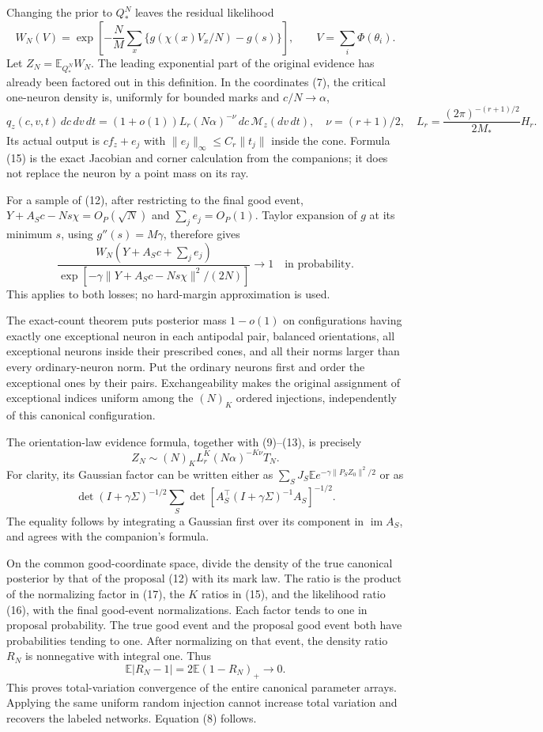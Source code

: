 \documentclass[11pt]{article}
\newcommand{\E}{\mathbb E}\newcommand{\R}{\mathbb R}
\begin{document}
Changing the prior to $Q_*^N$ leaves the residual likelihood
\[
 W_N(V)=\exp\left[-\frac NM\sum_x
             \{g(\chi(x)V_x/N)-g(s)\}\right],
             \qquad V=\sum_i\Phi(\theta_i).              \tag{14}
\]
Let $Z_N=\E_{Q_*^N}W_N$. The leading exponential part of the original
evidence has already been factored out in this definition.
In the coordinates (7), the critical one-neuron density is, uniformly
for bounded marks and $c/N\to\alpha$,
\[
 q_z(c,v,t)\,dc\,dv\,dt
 =(1+o(1))L_r(N\alpha)^{-\nu}\,dc\,\mathcal M_z(dv\,dt),
 \quad \nu=(r+1)/2,\quad
 L_r=\frac{(2\pi)^{-(r+1)/2}}{2M_*}H_r.                 \tag{15}
\]
Its actual output is $cf_z+e_j$ with
$\|e_j\|_\infty\le C_r\|t_j\|$ inside the cone. Formula (15) is the
exact Jacobian and corner calculation from the companions; it does not
replace the neuron by a point mass on its ray.

For a sample of (12), after restricting to the final good event,
$Y+A_Sc-Ns\chi=O_P(\sqrt N)$ and $\sum_je_j=O_P(1)$.
Taylor expansion of $g$ at its minimum $s$, using
$g''(s)=M\gamma$, therefore gives
\[
 \frac{W_N(Y+A_Sc+\sum_je_j)}
 {\exp[-\gamma\|Y+A_Sc-Ns\chi\|^2/(2N)]}\to1
 \quad\text{in probability}.                           \tag{16}
\]
This applies to both losses; no hard-margin approximation is used.

The exact-count theorem puts posterior mass $1-o(1)$ on configurations
having exactly one exceptional neuron in each antipodal pair, balanced
orientations, all exceptional neurons inside their prescribed cones,
and all their norms larger than every ordinary-neuron norm. Put the
ordinary neurons first and order the exceptional ones by their pairs.
Exchangeability makes the original assignment of exceptional indices
uniform among the $(N)_K$ ordered injections, independently of this
canonical configuration.

The orientation-law evidence formula, together with (9)--(13), is
precisely
\[
       Z_N\sim (N)_K L_r^K(N\alpha)^{-K\nu}T_N.         \tag{17}
\]
For clarity, its Gaussian factor can be written either as
$\sum_S J_S\E e^{-\gamma\|P_SZ_0\|^2/2}$ or as
\[
 \det(I+\gamma\Sigma)^{-1/2}
 \sum_S\det\left[A_S^\top(I+\gamma\Sigma)^{-1}A_S\right]^{-1/2}.
\]
The equality follows by integrating a Gaussian first over its component
in $\operatorname{im}A_S$, and agrees with the companion's formula.

On the common good-coordinate space, divide the density of the true
canonical posterior by that of the proposal (12) with its mark law.
The ratio is the product of the normalizing factor in (17), the $K$
ratios in (15), and the likelihood ratio (16), with the final good-event
normalizations. Each factor tends to one in proposal probability.
The true good event and the proposal good event both have probabilities
tending to one. After normalizing on that event, the density ratio
$R_N$ is nonnegative with integral one. Thus
\[
 \E|R_N-1|=2\E(1-R_N)_+\longrightarrow0.
\]
This proves total-variation convergence of the entire canonical
parameter arrays. Applying the same uniform random injection cannot
increase total variation and recovers the labeled networks. Equation
(8) follows.
\end{document}

